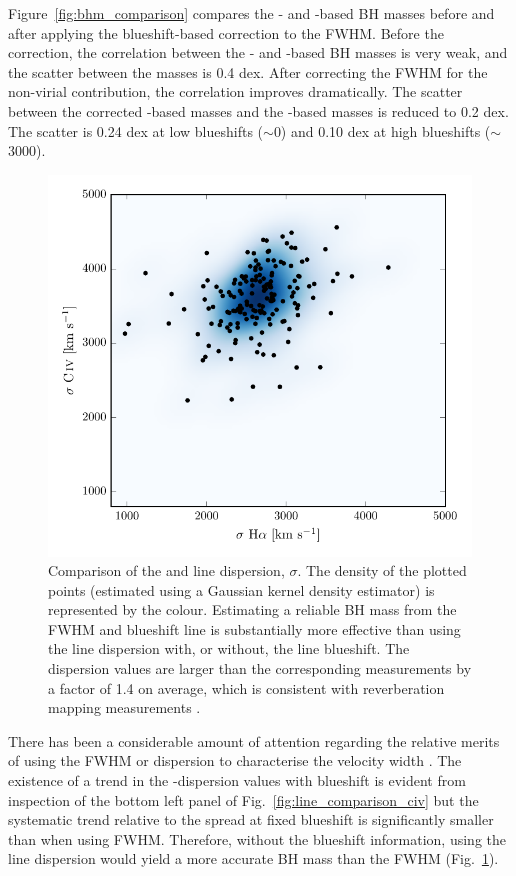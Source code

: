 Figure~\ref{fig:bhm_comparison} compares the - and \hans-based BH masses before and after applying the blueshift-based correction to the  FWHM.
Before the correction, the correlation between the - and \hans-based BH masses is very weak, and the scatter between the masses is 0.4 dex. 
After correcting the  FWHM for the non-virial contribution, the correlation improves dramatically. 
The scatter between the corrected -based masses and the \hans-based masses is reduced to 0.2 dex. 
The scatter is 0.24 dex at low  blueshifts ($\sim$0\kms) and 0.10 dex at high blueshifts ($\sim$3000\kms). 

\begin{figure}
    \centering 
    \includegraphics[width=0.8\columnwidth]{figures/chapter03/dispersion_comparison.pdf} 
    \caption{Comparison of the  and \ha line dispersion, $\sigma$. The density of the plotted points (estimated using a Gaussian kernel density estimator) is represented by the colour. Estimating a reliable BH mass from the  FWHM and blueshift line is substantially more effective than using the  line dispersion with, or without, the line blueshift. The  dispersion values are larger than the corresponding \ha measurements by a factor of 1.4 on average, which is consistent with reverberation mapping measurements \citep{vestergaard06}.} 
    \label{fig:dispersion_comparison}
\end{figure}

There has been a considerable amount of attention regarding the relative merits of using the FWHM or dispersion to characterise the velocity width \citep[e.g.][]{denney13}.
The existence of a trend in the -dispersion values with  blueshift is evident from inspection of the bottom left panel of Fig.~\ref{fig:line_comparison_civ} but the systematic trend relative to the spread at fixed blueshift is significantly smaller than when using  FWHM. 
Therefore, without the blueshift information, using the line dispersion would yield a more accurate BH mass than the FWHM (Fig.~\ref{fig:dispersion_comparison}). 

